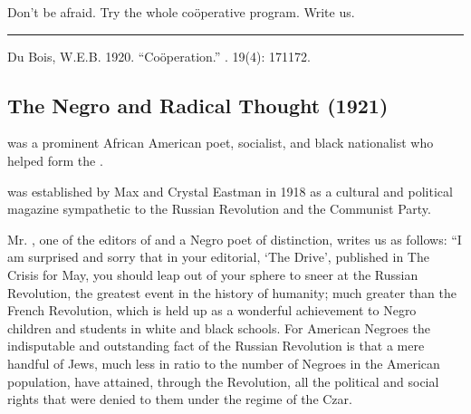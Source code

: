 \documentclass[letterpaper,10pt,english]{jupyterBook}
\begin{document}
\sphinxAtStartPar
Don’t be afraid. Try the whole coöperative program. Write us.


\bigskip\hrule\bigskip


\sphinxAtStartPar
{} Du Bois, W.E.B. 1920. “Coöperation.” . 19(4): 171\sphinxhyphen{}172.


\subsection{The Negro and Radical Thought (1921)}
\label{\detokenize{Volumes/22/03/negro_and_radical_thought:the-negro-and-radical-thought-1921}}\label{\detokenize{Volumes/22/03/negro_and_radical_thought::doc}}
\begin{sphinxShadowBox}
\sphinxstylesidebartitle{}

\sphinxAtStartPar
{} was a prominent African American poet, socialist, and black nationalist who helped form the .

\sphinxAtStartPar
{} was established by Max and Crystal Eastman in 1918 as a cultural and political magazine sympathetic to the Russian Revolution and the Communist Party.
\end{sphinxShadowBox}

\sphinxAtStartPar
Mr. , one of the editors of  and a Negro poet of distinction, writes us as follows: “I am surprised and sorry that in your editorial, ‘The Drive’, published in The Crisis for May, you should leap out of your sphere to sneer at the Russian Revolution, the greatest event in the history of humanity; much greater than the French Revolution, which is held up as a wonderful achievement to Negro children and students in white and black schools. For American Negroes the indisputable and outstanding fact of the Russian Revolution is that a mere handful of Jews, much less in ratio to the number of Negroes in the American population, have attained, through the Revolution, all the political and social rights that were denied to them under the regime of the Czar.
\end{document}
